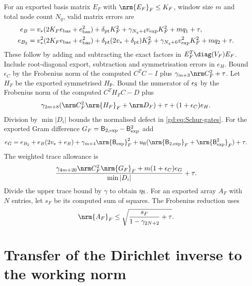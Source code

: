 For an exported basis matrix $E_F$ with $\nrm{E_F}_F\le K_F$,
window size $m$ and total node count $N_q$, valid matrix errors are
\begin{equation}\label{gd:eq:matrix-errors}
 \begin{split}
 e_B={}&v_*(2K_Fe_{\rm bas}+e_{\rm bas}^2)+\delta_{\rm pt} K_F^2
              +\gamma_{N_q+4}v_{\rm exp}K_F^2+mq_1+\tau,\\
 e_{B_2}={}&v_*^2(2K_Fe_{\rm bas}+e_{\rm bas}^2)
       +\delta_{\rm pt}(2v_*+\delta_{\rm pt})K_F^2
       +\gamma_{N_q+6}v_{\rm exp}^2K_F^2+mq_2+\tau .
 \end{split}
\end{equation}
These follow by adding and subtracting the exact factors in
$E_F^T\diag(V_F)E_F$. Include root-diagonal export, subtraction
and symmetrisation errors in $e_H$.
Bound $\epsilon_C$ by the Frobenius norm of the computed $C^TC-I$
plus $\gamma_{m+3}\nrm C_F^2+\tau$.
Let $H_F$ be the exported symmetrised $H_{\mathsf P}$. Bound the numerator of
$\epsilon_{\rm S}$ by the Frobenius norm of the computed $C^TH_FC-D$ plus
\[
 \gamma_{2m+8}(\nrm C_F^2\nrm{H_F}_F+\nrm D_F)+\tau
                    +(1+\epsilon_C)e_H.
\]
Division by $\min|D_i|$ bounds the normalised defect in
\eqref{gd:eq:Schur-gates}.
For the exported Gram difference $G_F=\mathsf B_{2,\rm exp}-\mathsf B_{\rm exp}^2$ add
\begin{equation}\label{gd:eq:Gram-error}
 e_G=e_{B_2}+e_B(2v_*+e_B)+\gamma_{m+4}\nrm{\mathsf B_{\rm exp}}_F^2
                  +u_{\rm fl}(\nrm{\mathsf B_{2,\rm exp}}_F+\nrm{\mathsf B_{\rm exp}^2}_F)+\tau .
\end{equation}
The weighted trace allowance is
\[
 \frac{\gamma_{4m+20}\nrm C_F^2\nrm{G_F}_F
              +m(1+\epsilon_C)e_G}{\min|D_i|}+\tau .
\]
Divide the upper trace bound by $\gamma$ to obtain $\eta_{\rm S}$.
For an exported array $A_F$ with $N$ entries, let $s_F$ be its computed
sum of squares. The Frobenius reduction uses
\[
 \nrm{A_F}_F\le\sqrt{\frac{s_F}{1-\gamma_{2N+2}}+\tau}.
\]

\section{Transfer of the Dirichlet inverse to the working norm}
\label{gd:sec:transfer}

